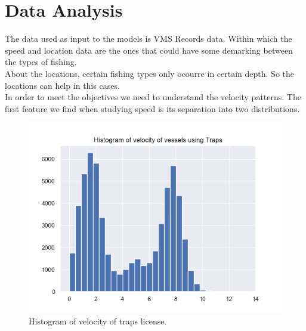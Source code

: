 

\section{Data Analysis} %
\label{sub:data_analysis}



The data used as input to the models is VMS Records data. Within which the speed and location data are the ones that could have some demarking between the types of fishing.\\
About the locations, certain fishing types only ocourre in certain depth. So the locations can help in this cases. \\
In order to meet the objectives we need to understand the velocity patterns.
The first feature we find when studying speed is its separation into two distributions.

\begin{figure}[h]
    \centering
    \includegraphics[width=0.8\linewidth]{Chapters/img/h_armadilhas.png}
    \caption{Histogram of velocity of traps license.}
    \label{fig:h_armadilhas}
\end{figure}


